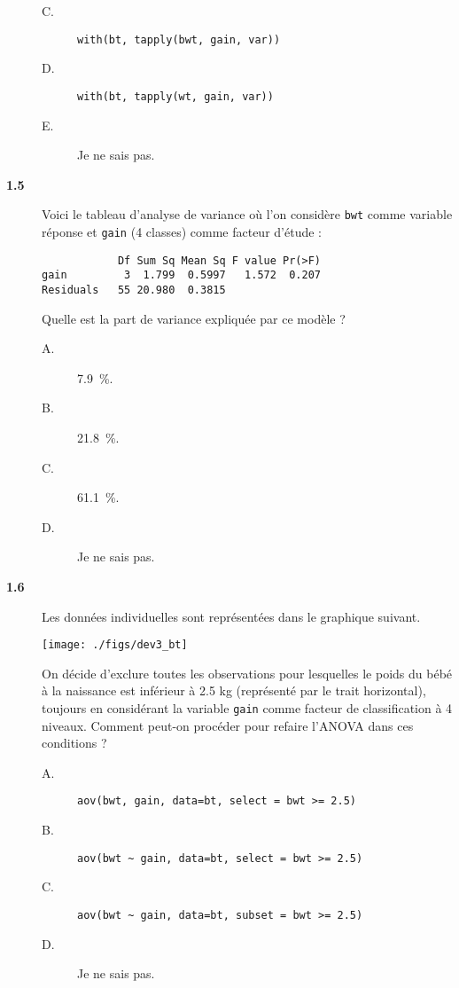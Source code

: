 \documentclass[11pt]{report}
\theoremstyle{definition}
\begin{document}
\begin{description}
\begin{description}
  \item[C.] \verb|with(bt, tapply(bwt, gain, var))|
  \item[D.] \verb|with(bt, tapply(wt, gain, var))|
  \item[E.] Je ne sais pas.
  \end{description}  
\item[\bf 1.5]  Voici le tableau d'analyse de
  variance où l'on considère \texttt{bwt} comme variable réponse et
  \texttt{gain} (4 classes) comme facteur d'étude :
\begin{verbatim}
            Df Sum Sq Mean Sq F value Pr(>F)
gain         3  1.799  0.5997   1.572  0.207
Residuals   55 20.980  0.3815
\end{verbatim}
Quelle est la part de variance expliquée par ce modèle ? 
\begin{description}
\item[A.] 7.9~\%.  %
\item[B.] 21.8~\%. %
\item[C.] 61.1~\%.  %
\item[D.] Je ne sais pas.
\end{description}  
\item[\bf 1.6]  Les données individuelles sont
  représentées dans le graphique suivant.
\begin{center}
  \texttt{[image: ./figs/dev3\_bt]}
\end{center}
On décide d'exclure toutes les observations pour lesquelles le poids du
bébé à la naissance est inférieur à 2.5 kg (représenté par le trait
horizontal), toujours en considérant la variable \texttt{gain} comme
facteur de classification à 4 niveaux. Comment peut-on procéder pour refaire
l'ANOVA dans ces conditions ? 
\begin{description}
\item[A.] \verb|aov(bwt, gain, data=bt, select = bwt >= 2.5)|
\item[B.] \verb|aov(bwt ~ gain, data=bt, select = bwt >= 2.5)|
\item[C.] \verb|aov(bwt ~ gain, data=bt, subset = bwt >= 2.5)|
\item[D.] Je ne sais pas.
\end{description}  
\end{description}
\end{document}
